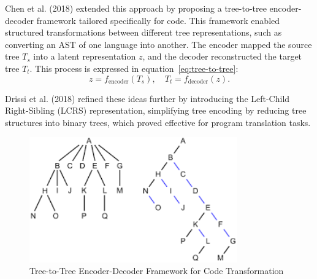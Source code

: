 \documentclass{dhbenelux}
\begin{document}
Chen et al. (2018) extended this approach by proposing a tree-to-tree encoder-decoder framework tailored specifically for code. This framework enabled structured transformations between different tree representations, such as converting an AST of one language into another. The encoder mapped the source tree \( T_s \) into a latent representation \( z \), and the decoder reconstructed the target tree \( T_t \). This process is expressed in equation~\ref{eq:tree-to-tree}:
\begin{equation}
z = f_{\text{encoder}}(T_s), \quad T_t = f_{\text{decoder}}(z).
\label{eq:tree-to-tree}
\end{equation}

Drissi et al. (2018) refined these ideas further by introducing the Left-Child Right-Sibling (LCRS) representation, simplifying tree encoding by reducing tree structures into binary trees, which proved effective for program translation tasks.

\begin{figure}[h]
    \centering
    \includegraphics[width=0.8\textwidth]{Images/2.png} %
    \caption{Tree-to-Tree Encoder-Decoder Framework for Code Transformation}
    \label{fig:tree-encoder-decoder}
\end{figure}
\end{document}
